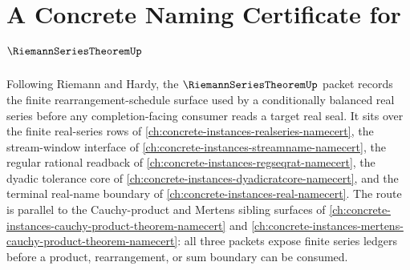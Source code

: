\chapter{A Concrete Naming Certificate for $\RiemannSeriesTheoremUp$}
\label{ch:concrete-instances-riemann-series-theorem-namecert}

Following Riemann and Hardy, the $\RiemannSeriesTheoremUp$ packet records the finite rearrangement-schedule surface used by a conditionally balanced real series before any completion-facing consumer reads a target real seal. It sits over the finite real-series rows of \autoref{ch:concrete-instances-realseries-namecert}, the stream-window interface of \autoref{ch:concrete-instances-streamname-namecert}, the regular rational readback of \autoref{ch:concrete-instances-regseqrat-namecert}, the dyadic tolerance core of \autoref{ch:concrete-instances-dyadicratcore-namecert}, and the terminal real-name boundary of \autoref{ch:concrete-instances-real-namecert}. The route is parallel to the Cauchy-product and Mertens sibling surfaces of \autoref{ch:concrete-instances-cauchy-product-theorem-namecert} and \autoref{ch:concrete-instances-mertens-cauchy-product-theorem-namecert}: all three packets expose finite series ledgers before a product, rearrangement, or sum boundary can be consumed.

